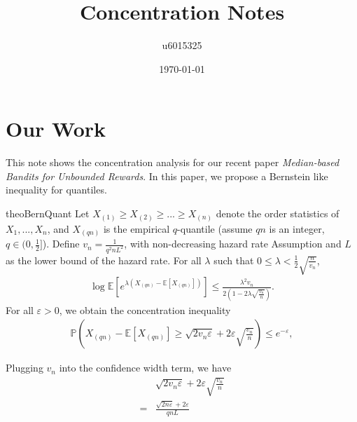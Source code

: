 \documentclass{article}
\title{Concentration Notes}
\author{u6015325 }
\date{\today}
\theoremstyle{plain}
\begin{document}
\maketitle

\section{Our Work}

This note shows the concentration analysis for our recent paper \textit{Median-based Bandits for Unbounded Rewards}. In this paper, we propose a Bernstein like inequality for quantiles.
\begin{restatable}{theo}{BernQuant}
\label{theo: Bernstein Inequality for Quantiles.}
Let $X_{\left(1\right)} \geq X_{\left(2\right)} \geq ... \geq X_{\left(n\right)}$ denote the order statistics of $X_1, ..., X_n$, and $X_{(qn)}$ is the empirical $q$-quantile (assume $qn$ is an integer, $q \in (0, \frac{1}{2}]$).
Define $v_n = \frac{1}{q^2 n L^2}$, with non-decreasing hazard rate Assumption and $L$ as the lower bound of the hazard rate.
For all $\lambda$ such that $0 \leq \lambda< \frac{1}{2} \sqrt{\frac{n}{v_n}}$,
\begin{align}
    \label{equ: log mgf for quantile}
    \log \mathbb{E}\left[e^{\lambda\left(X_{\left(qn\right)}-\mathbb{E}[X_{\left(qn\right)}] \right)}\right] \leq  \frac{\lambda^{2}  v_{n}}{2 \left(1-2 \lambda \sqrt{\frac{v_{n}}{n}}\right)}.
\end{align}
For all $\varepsilon > 0$, we obtain the concentration inequality
\begin{align}
    \label{equ: bernstein ineq for quantile}
    \mathbb{P}\left(X_{\left(qn\right)}-\mathbb{E}[X_{\left(qn\right)}] \geq \sqrt{2 v_{n} \varepsilon}+2 \varepsilon \sqrt{\frac{v_{n}}{n}}\right) \leq e^{-\varepsilon},
\end{align}
\end{restatable}

Plugging $v_n$ into the confidence width term, we have 
\begin{align}
& \sqrt{2 v_{n} \varepsilon}+2 \varepsilon \sqrt{\frac{v_{n}}{n}}\\
=& \frac{\sqrt{2n\varepsilon} + 2 \varepsilon}{qnL}
\end{align}
\end{document}
